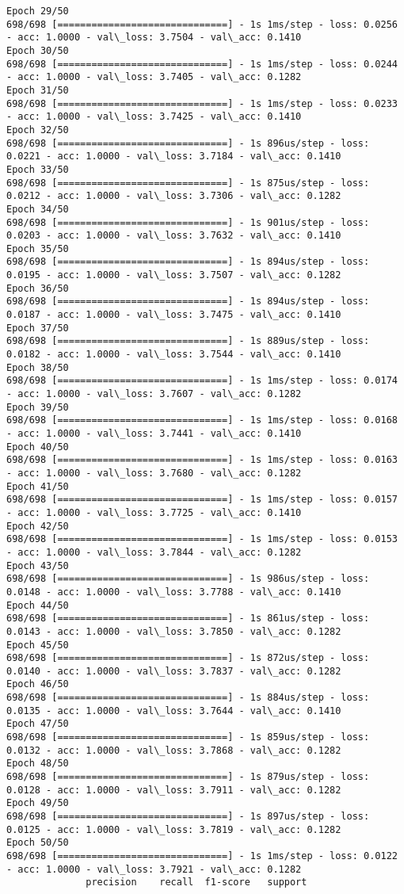 \documentclass[11pt]{article}
\begin{document}
\begin{Verbatim}[commandchars=\\\{\}]
Epoch 29/50
698/698 [==============================] - 1s 1ms/step - loss: 0.0256 - acc: 1.0000 - val\_loss: 3.7504 - val\_acc: 0.1410
Epoch 30/50
698/698 [==============================] - 1s 1ms/step - loss: 0.0244 - acc: 1.0000 - val\_loss: 3.7405 - val\_acc: 0.1282
Epoch 31/50
698/698 [==============================] - 1s 1ms/step - loss: 0.0233 - acc: 1.0000 - val\_loss: 3.7425 - val\_acc: 0.1410
Epoch 32/50
698/698 [==============================] - 1s 896us/step - loss: 0.0221 - acc: 1.0000 - val\_loss: 3.7184 - val\_acc: 0.1410
Epoch 33/50
698/698 [==============================] - 1s 875us/step - loss: 0.0212 - acc: 1.0000 - val\_loss: 3.7306 - val\_acc: 0.1282
Epoch 34/50
698/698 [==============================] - 1s 901us/step - loss: 0.0203 - acc: 1.0000 - val\_loss: 3.7632 - val\_acc: 0.1410
Epoch 35/50
698/698 [==============================] - 1s 894us/step - loss: 0.0195 - acc: 1.0000 - val\_loss: 3.7507 - val\_acc: 0.1282
Epoch 36/50
698/698 [==============================] - 1s 894us/step - loss: 0.0187 - acc: 1.0000 - val\_loss: 3.7475 - val\_acc: 0.1410
Epoch 37/50
698/698 [==============================] - 1s 889us/step - loss: 0.0182 - acc: 1.0000 - val\_loss: 3.7544 - val\_acc: 0.1410
Epoch 38/50
698/698 [==============================] - 1s 1ms/step - loss: 0.0174 - acc: 1.0000 - val\_loss: 3.7607 - val\_acc: 0.1282
Epoch 39/50
698/698 [==============================] - 1s 1ms/step - loss: 0.0168 - acc: 1.0000 - val\_loss: 3.7441 - val\_acc: 0.1410
Epoch 40/50
698/698 [==============================] - 1s 1ms/step - loss: 0.0163 - acc: 1.0000 - val\_loss: 3.7680 - val\_acc: 0.1282
Epoch 41/50
698/698 [==============================] - 1s 1ms/step - loss: 0.0157 - acc: 1.0000 - val\_loss: 3.7725 - val\_acc: 0.1410
Epoch 42/50
698/698 [==============================] - 1s 1ms/step - loss: 0.0153 - acc: 1.0000 - val\_loss: 3.7844 - val\_acc: 0.1282
Epoch 43/50
698/698 [==============================] - 1s 986us/step - loss: 0.0148 - acc: 1.0000 - val\_loss: 3.7788 - val\_acc: 0.1410
Epoch 44/50
698/698 [==============================] - 1s 861us/step - loss: 0.0143 - acc: 1.0000 - val\_loss: 3.7850 - val\_acc: 0.1282
Epoch 45/50
698/698 [==============================] - 1s 872us/step - loss: 0.0140 - acc: 1.0000 - val\_loss: 3.7837 - val\_acc: 0.1282
Epoch 46/50
698/698 [==============================] - 1s 884us/step - loss: 0.0135 - acc: 1.0000 - val\_loss: 3.7644 - val\_acc: 0.1410
Epoch 47/50
698/698 [==============================] - 1s 859us/step - loss: 0.0132 - acc: 1.0000 - val\_loss: 3.7868 - val\_acc: 0.1282
Epoch 48/50
698/698 [==============================] - 1s 879us/step - loss: 0.0128 - acc: 1.0000 - val\_loss: 3.7911 - val\_acc: 0.1282
Epoch 49/50
698/698 [==============================] - 1s 897us/step - loss: 0.0125 - acc: 1.0000 - val\_loss: 3.7819 - val\_acc: 0.1282
Epoch 50/50
698/698 [==============================] - 1s 1ms/step - loss: 0.0122 - acc: 1.0000 - val\_loss: 3.7921 - val\_acc: 0.1282
              precision    recall  f1-score   support


\end{Verbatim}
\end{document}
